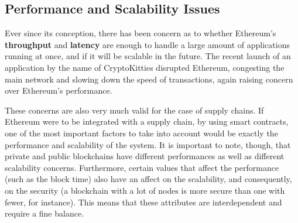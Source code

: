 

\subsection{Performance and Scalability Issues}



Ever since its conception, there has been concern as to whether Ethereum's \textbf{throughput} and \textbf{latency} are enough to handle a large amount of applications running at once, and if it will be scalable in the future. The recent launch of an application by the name of CryptoKitties disrupted Ethereum, congesting the main network and slowing down the speed of transactions, again raising concern over Ethereum's performance.

These concerns are also very much valid for the case of supply chains. If Ethereum were to be integrated with a supply chain, by using smart contracts, one of the most important factors to take into account would be exactly the performance and scalability of the system. It is important to note, though, that private and public blockchains have different performances as well as different scalability concerns. Furthermore, certain values that affect the performance (such as the block time) also have an affect on the scalability, and consequently, on the security (a blockchain with a lot of nodes is more secure than one with fewer, for instance). This means that these attributes are interdependent and require a fine balance.

